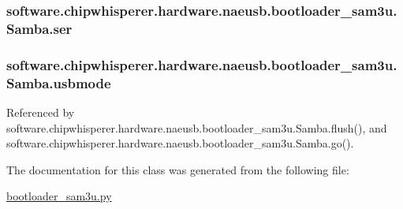 \subsubsection[{ser}]{\setlength{\rightskip}{0pt plus 5cm}software.\+chipwhisperer.\+hardware.\+naeusb.\+bootloader\+\_\+sam3u.\+Samba.\+ser}\label{classsoftware_1_1chipwhisperer_1_1hardware_1_1naeusb_1_1bootloader__sam3u_1_1Samba_a17f97805e8dd9c84deb97669cc32789a}
\hypertarget{classsoftware_1_1chipwhisperer_1_1hardware_1_1naeusb_1_1bootloader__sam3u_1_1Samba_af9b6adeead18bed98758bd8e4be161fd}{}
\subsubsection[{usbmode}]{\setlength{\rightskip}{0pt plus 5cm}software.\+chipwhisperer.\+hardware.\+naeusb.\+bootloader\+\_\+sam3u.\+Samba.\+usbmode}\label{classsoftware_1_1chipwhisperer_1_1hardware_1_1naeusb_1_1bootloader__sam3u_1_1Samba_af9b6adeead18bed98758bd8e4be161fd}


Referenced by software.\+chipwhisperer.\+hardware.\+naeusb.\+bootloader\+\_\+sam3u.\+Samba.\+flush(), and software.\+chipwhisperer.\+hardware.\+naeusb.\+bootloader\+\_\+sam3u.\+Samba.\+go().



The documentation for this class was generated from the following file\+:\begin{DoxyCompactItemize}
\item 
\hyperlink{bootloader__sam3u_8py}{bootloader\+\_\+sam3u.\+py}\end{DoxyCompactItemize}
